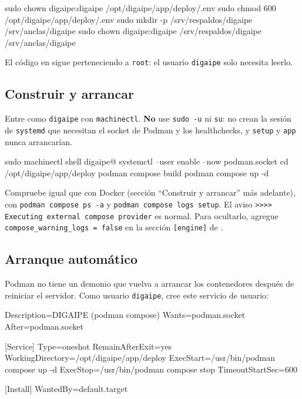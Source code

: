 \begin{codigo}
sudo chown digaipe:digaipe /opt/digaipe/app/deploy/.env
sudo chmod 600 /opt/digaipe/app/deploy/.env
sudo mkdir -p /srv/respaldos/digaipe /srv/anclas/digaipe
sudo chown digaipe:digaipe /srv/respaldos/digaipe /srv/anclas/digaipe
\end{codigo}

El código en  sigue perteneciendo a \texttt{root}: el usuario
\texttt{digaipe} solo necesita leerlo.

\subsection{Construir y arrancar}

Entre como \texttt{digaipe} con \texttt{machinectl}. \textbf{No} use \texttt{sudo -u} ni
\texttt{su}: no crean la sesión de \texttt{systemd} que necesitan el socket de Podman y los
healthchecks, y \texttt{setup} y \texttt{app} nunca arrancarían.

\begin{codigo}
sudo machinectl shell digaipe@
systemctl --user enable --now podman.socket
cd /opt/digaipe/app/deploy
podman compose build
podman compose up -d
\end{codigo}

Compruebe igual que con Docker (sección ``Construir y arrancar'' más adelante), con
\texttt{podman compose ps -a} y \texttt{podman compose logs setup}. El aviso
\texttt{>>>> Executing external compose provider} es normal. Para ocultarlo, agregue
\texttt{compose\_warning\_logs = false} en la sección \texttt{[engine]} de
.

\subsection{Arranque automático}
\label{sec:podman-arranque}

Podman no tiene un demonio que vuelva a arrancar los contenedores después de reiniciar el
servidor. Como usuario \texttt{digaipe}, cree este servicio de usuario:

\begin{codigo}[label={/home/digaipe/.config/systemd/user/digaipe.service}]
[Unit]
Description=DIGAIPE (podman compose)
Wants=podman.socket
After=podman.socket

[Service]
Type=oneshot
RemainAfterExit=yes
WorkingDirectory=/opt/digaipe/app/deploy
ExecStart=/usr/bin/podman compose up -d
ExecStop=/usr/bin/podman compose stop
TimeoutStartSec=600

[Install]
WantedBy=default.target
\end{codigo}

